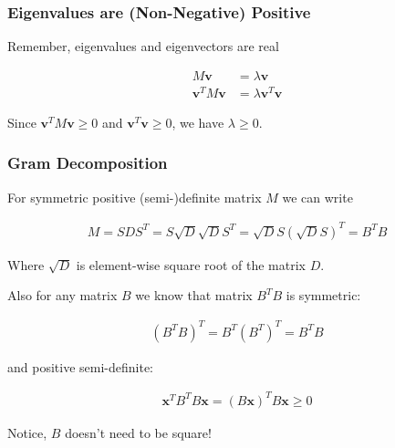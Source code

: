 \documentclass[8pt]{beamer}
\begin{document}

\begin{frame}
\frametitle{Eigenvalues are (Non-Negative) Positive}

Remember, eigenvalues and eigenvectors are real

\begin{align*}
    M \mathbf{v} &= \lambda \mathbf{v} \\
    \mathbf{v}^T M \mathbf{v} &= \lambda \mathbf{v}^T \mathbf{v}
\end{align*}

Since $\mathbf{v}^T M \mathbf{v} \geq 0$ and $\mathbf{v}^T \mathbf{v} \geq 0$, we have $\lambda \geq 0$.

\end{frame}


\begin{frame}
\frametitle{Gram Decomposition}

For symmetric positive (semi-)definite matrix $M$ we can write

\begin{align*}
    M = S D S^T = S \sqrt{D} \sqrt{D} S^T = \sqrt{D} S (\sqrt{D} S)^T = B^T B
\end{align*}

Where $\sqrt{D}$ is element-wise square root of the matrix $D$. 

Also for any matrix $B$ we know that matrix $B^T B$ is symmetric:

\begin{align*}
    (B^T B)^T = B^T (B^T)^T = B^T B
\end{align*}

and positive semi-definite:

\begin{align*}
    \mathbf{x}^T B^T B \mathbf{x} = (B \mathbf{x})^T B \mathbf{x} \geq 0
\end{align*}

Notice, $B$ doesn't need to be square!

\end{frame}
\end{document}
